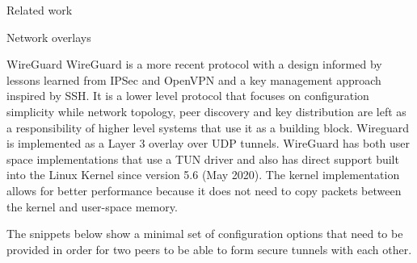 \begin{frame}[fragile]{Related work}
\begin{block}{Network overlays}
\begin{block}{WireGuard}
\protect\hypertarget{wireguard}{}
WireGuard\autocite{donenfeldWireGuardNextGeneration2017} is a more
recent protocol with a design informed by lessons learned from IPSec and
OpenVPN and a key management approach inspired by SSH. It is a lower
level protocol that focuses on configuration simplicity while network
topology, peer discovery and key distribution are left as a
responsibility of higher level systems that use it as a building block.
Wireguard is implemented as a Layer 3 overlay over UDP tunnels.
WireGuard has both user space implementations that use a TUN driver and
also has direct support built into the Linux Kernel since version 5.6
(May 2020). The kernel implementation allows for better performance
because it does not need to copy packets between the kernel and
user-space memory.

The snippets below show a minimal set of configuration options that need
to be provided in order for two peers to be able to form secure tunnels
with each other.

\begin{Shaded}
\begin{Highlighting}[]
\KeywordTok{[Interface]}
\OtherTok{=}
\OtherTok{=}\StringTok{ }
\OtherTok{=}

\KeywordTok{[Peer]}
\OtherTok{=}
\OtherTok{=}
\OtherTok{=}
\end{Highlighting}
\end{Shaded}

\begin{Shaded}
\begin{Highlighting}[]
\KeywordTok{[Interface]}
\OtherTok{=}
\OtherTok{=}\StringTok{ }
\OtherTok{=}

\KeywordTok{[Peer]}
\OtherTok{=}
\OtherTok{=}
\end{Highlighting}
\end{Shaded}


\end{block}
\end{block}
\end{frame}
